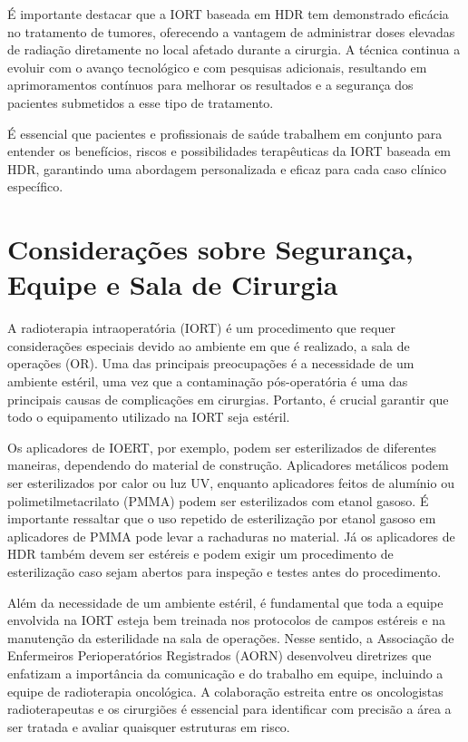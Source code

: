 \documentclass[11pt,a4paper]{article}
\newcounter{exemplo}
\begin{document}
	É importante destacar que a IORT baseada em HDR tem demonstrado eficácia no tratamento de tumores, oferecendo a vantagem de administrar doses elevadas de radiação diretamente no local afetado durante a cirurgia. A técnica continua a evoluir com o avanço tecnológico e com pesquisas adicionais, resultando em aprimoramentos contínuos para melhorar os resultados e a segurança dos pacientes submetidos a esse tipo de tratamento.

	É essencial que pacientes e profissionais de saúde trabalhem em conjunto para entender os benefícios, riscos e possibilidades terapêuticas da IORT baseada em HDR, garantindo uma abordagem personalizada e eficaz para cada caso clínico específico.

\section{Considerações sobre Segurança, Equipe e Sala de Cirurgia}

	A radioterapia intraoperatória (IORT) é um procedimento que requer considerações especiais devido ao ambiente em que é realizado, a sala de operações (OR). Uma das principais preocupações é a necessidade de um ambiente estéril, uma vez que a contaminação pós-operatória é uma das principais causas de complicações em cirurgias. Portanto, é crucial garantir que todo o equipamento utilizado na IORT seja estéril.

	Os aplicadores de IOERT, por exemplo, podem ser esterilizados de diferentes maneiras, dependendo do material de construção. Aplicadores metálicos podem ser esterilizados por calor ou luz UV, enquanto aplicadores feitos de alumínio ou polimetilmetacrilato (PMMA) podem ser esterilizados com etanol gasoso. É importante ressaltar que o uso repetido de esterilização por etanol gasoso em aplicadores de PMMA pode levar a rachaduras no material. Já os aplicadores de HDR também devem ser estéreis e podem exigir um procedimento de esterilização caso sejam abertos para inspeção e testes antes do procedimento.

	Além da necessidade de um ambiente estéril, é fundamental que toda a equipe envolvida na IORT esteja bem treinada nos protocolos de campos estéreis e na manutenção da esterilidade na sala de operações. Nesse sentido, a Associação de Enfermeiros Perioperatórios Registrados (AORN) desenvolveu diretrizes que enfatizam a importância da comunicação e do trabalho em equipe, incluindo a equipe de radioterapia oncológica. A colaboração estreita entre os oncologistas radioterapeutas e os cirurgiões é essencial para identificar com precisão a área a ser tratada e avaliar quaisquer estruturas em risco.
\end{document}
